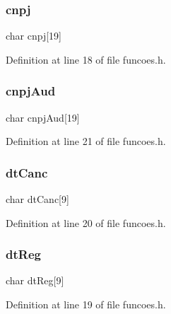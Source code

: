 \subsubsection{\texorpdfstring{cnpj}{cnpj}}
{\footnotesize\ttfamily char cnpj\mbox{[}19\mbox{]}}



Definition at line 18 of file funcoes.\+h.

\mbox{\label{struct_registro_ac767d84f592cf1f81fc71011438501d4}} 
\subsubsection{\texorpdfstring{cnpj\+Aud}{cnpjAud}}
{\footnotesize\ttfamily char cnpj\+Aud\mbox{[}19\mbox{]}}



Definition at line 21 of file funcoes.\+h.

\mbox{\label{struct_registro_a4f39de4ffcb6e778b57e6cf9711c58fd}} 
\subsubsection{\texorpdfstring{dt\+Canc}{dtCanc}}
{\footnotesize\ttfamily char dt\+Canc\mbox{[}9\mbox{]}}



Definition at line 20 of file funcoes.\+h.

\mbox{\label{struct_registro_aea2f574e5e43077e6f9f79e8030c413c}} 
\subsubsection{\texorpdfstring{dt\+Reg}{dtReg}}
{\footnotesize\ttfamily char dt\+Reg\mbox{[}9\mbox{]}}



Definition at line 19 of file funcoes.\+h.

\mbox{\label{struct_registro_a359053646ba364b1cf818bf4d771045e}} 
